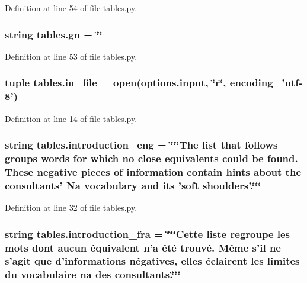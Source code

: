 Definition at line 54 of file tables.\+py.

\hypertarget{namespacetables_a5707a1dd645c7d5ca668e14f4cc8bcb3}{
\subsubsection[{gn}]{\setlength{\rightskip}{0pt plus 5cm}string tables.\+gn = \char`\"{}\char`\"{}}}\label{namespacetables_a5707a1dd645c7d5ca668e14f4cc8bcb3}


Definition at line 53 of file tables.\+py.

\hypertarget{namespacetables_a1975763f19d6c9aef3a5b7becaf1084f}{
\subsubsection[{in\+\_\+file}]{\setlength{\rightskip}{0pt plus 5cm}tuple tables.\+in\+\_\+file = open(options.\+input, \char`\"{}r\char`\"{}, encoding='utf-\/8')}}\label{namespacetables_a1975763f19d6c9aef3a5b7becaf1084f}


Definition at line 14 of file tables.\+py.

\hypertarget{namespacetables_afb2322668f3f126cd578ae1d25c07957}{
\subsubsection[{introduction\+\_\+eng}]{\setlength{\rightskip}{0pt plus 5cm}string tables.\+introduction\+\_\+eng = \char`\"{}\char`\"{}\char`\"{}The list that follows groups words for which no close equivalents could be found. These negative pieces of information contain hints about the consultants' Na vocabulary and its 'soft shoulders'.\char`\"{}\char`\"{}\char`\"{}}}\label{namespacetables_afb2322668f3f126cd578ae1d25c07957}


Definition at line 32 of file tables.\+py.

\hypertarget{namespacetables_a26cd4412ae8563a5ee426d893f55bfd5}{
\subsubsection[{introduction\+\_\+fra}]{\setlength{\rightskip}{0pt plus 5cm}string tables.\+introduction\+\_\+fra = \char`\"{}\char`\"{}\char`\"{}Cette liste regroupe les mots dont aucun équivalent n'a été trouvé. Même s'il ne s'agit que d'informations négatives, elles éclairent les limites du vocabulaire na des consultants.\char`\"{}\char`\"{}\char`\"{}}}\label{namespacetables_a26cd4412ae8563a5ee426d893f55bfd5}


